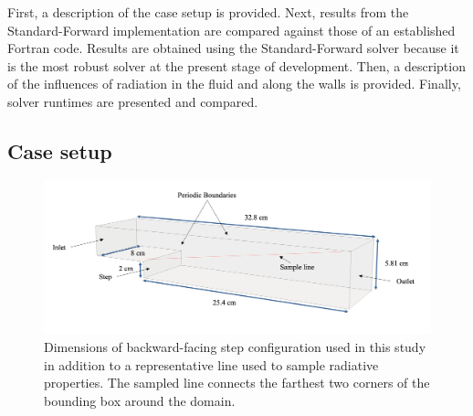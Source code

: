 First, a description of the case setup is provided. Next, results from the Standard-Forward implementation are compared against those of an established Fortran code. Results are obtained using the Standard-Forward solver because it is the most robust solver at the present stage of development.
Then, a description of the influences of radiation in the fluid and along the walls is provided. Finally, solver runtimes are presented and compared.



\subsection{Case setup}

\begin{figure}
\includegraphics[width=\linewidth]{figures/ch4/BFS_geometry.png}
\caption{Dimensions of backward-facing step configuration used in this study in addition to a representative line used to sample radiative properties. The sampled line connects the farthest two corners of the bounding box around the domain.}
\label{fig:BFS_geometry}
\end{figure}

